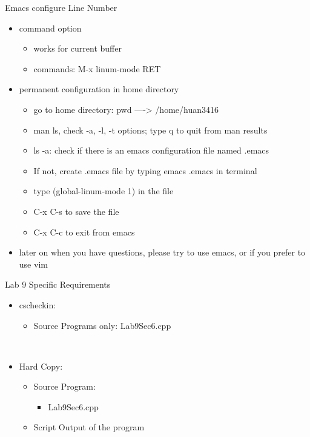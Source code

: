 \documentclass[presentation]{beamer}
\begin{document}
\begin{frame}[label=sec-1]{Emacs configure \alert{Line Number}}
\begin{itemize}
\item command option
\begin{itemize}
\item works for current buffer
\item commands: \alert{M-x linum-mode RET}
\end{itemize}
\item permanent configuration in home directory
\begin{itemize}
\item go to home directory: \alert{pwd} ----> \alert{/home/huan3416}
\item \alert{man ls}, check \alert{-a}, \alert{-l}, \alert{-t} options; type \alert{q} to quit from \alert{man} results
\item \alert{ls -a}: check if there is an emacs configuration file named \alert{.emacs}
\item If not, create \alert{.emacs} file by typing \alert{emacs .emacs} in terminal
\item type \alert{(global-linum-mode 1)} in the file
\item \alert{C-x C-s} to \alert{save} the file
\item \alert{C-x C-c} to \alert{exit} from emacs
\end{itemize}
\item later on when you have questions, please try to use \alert{emacs}, or if you prefer to use \alert{vim}
\end{itemize}
\end{frame}

\begin{frame}[label=sec-2]{Lab 9 Specific Requirements}
\begin{itemize}
\item \alert{cscheckin}:
\begin{itemize}
\item \alert{Source Programs} only: \alert{Lab9Sec6.cpp}
\end{itemize}
\end{itemize}
\\
\begin{itemize}
\item \alert{Hard Copy}:
\begin{itemize}
\item \alert{Source Program}: 
\begin{itemize}
\item Lab9Sec6.cpp
\end{itemize}
\item \alert{Script Output} of the program
\end{itemize}
\end{itemize}
\end{frame}
\end{document}
